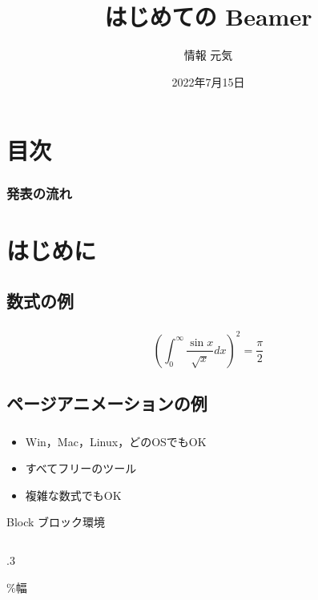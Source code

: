\documentclass[aspectratio=1610,dvipdfmx,12pt]{beamer}
\title{はじめての Beamer}
\author[情報]{情報 元気}
\institute[愛知県立大]{愛知県立大学　情報科学部}
\date{2022年7月15日}
\begin{document}
\begin{frame}
  \titlepage
\end{frame}

\section*{目次}
\begin{frame}\frametitle{発表の流れ}
  \tableofcontents
\end{frame}

\section{はじめに}
\subsection{数式の例}
\begin{frame}\frametitle{\insertsubsection}
   \[ \left(%
       \int_0^\infty \frac{\sin x}{\sqrt {x}} dx
     \right)^2 = \frac{\pi}{2} \]
\end{frame}

\subsection{ページアニメーションの例}
\begin{frame}\frametitle{\insertsubsection}
  \begin{itemize}
    \item<1-> Win，Mac，Linux，どのOSでもOK
    \item<2-> すべてフリーのツール
    \item<3-> 複雑な数式でもOK
  \end{itemize}
\end{frame}
\begin{block}{Block}
  ブロック環境
\end{block}
\begin{columns}
  \begin{column}[t]{.3\textwidth}
    \begin{block}{\mbox{}} 
       {\scriptsize \verb@{}\%幅}
    \end{block}       
  \end{column}
\end{columns}
\end{document}
